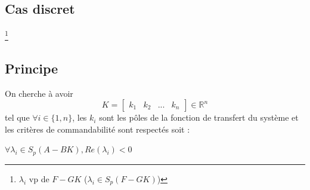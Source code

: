 \subsection{Cas discret}
\begin{center}
     \footnote{$\lambda_{i}$ vp de $F - GK$ ($\lambda_{i} \in S_{p}(F-GK)$)}
\end{center}
\subsection{Principe}
On cherche à avoir 
\[K = 
\begin{bmatrix}
    k_{1} & k_{2} & ... & k_{n}
\end{bmatrix}
\in \mathbb{R}^{n}
\]
tel que $\forall i \in \{1,n\}$, les $k_{i}$ sont les pôles de la fonction de transfert du système et les critères de commandabilité sont respectés soit :
\begin{center}
    \item $\forall \lambda_{i} \in S_{p}(A - BK),Re(\lambda_{i}) < 0$ \newline
\end{center} 

\newpage
